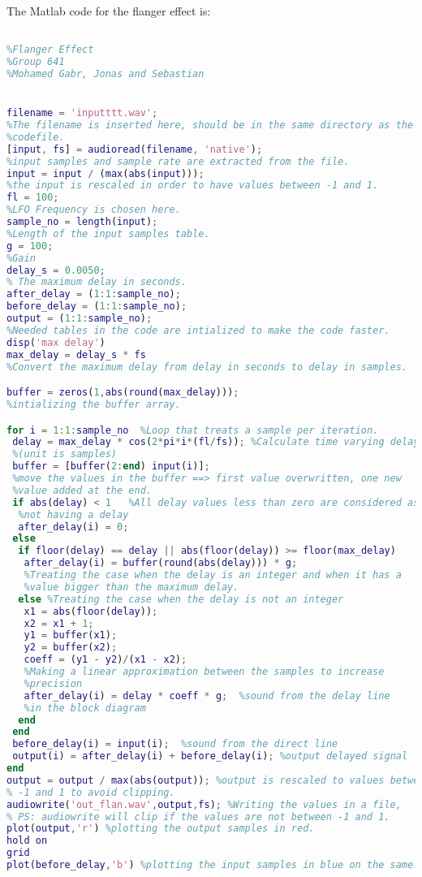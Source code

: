 The Matlab code for the flanger effect is:

\begin{lstlisting}[language=Matlab, caption= Matlab code for flanger effect]

%Flanger Effect
%Group 641
%Mohamed Gabr, Jonas and Sebastian


filename = 'inputttt.wav'; 
%The filename is inserted here, should be in the same directory as the
%codefile.
[input, fs] = audioread(filename, 'native');
%input samples and sample rate are extracted from the file.
input = input / (max(abs(input)));
%the input is rescaled in order to have values between -1 and 1. 
fl = 100;  
%LFO Frequency is chosen here.
sample_no = length(input); 
%Length of the input samples table.
g = 100; 
%Gain
delay_s = 0.0050; 
% The maximum delay in seconds.
after_delay = (1:1:sample_no); 
before_delay = (1:1:sample_no);
output = (1:1:sample_no);
%Needed tables in the code are intialized to make the code faster.
disp('max delay')
max_delay = delay_s * fs  
%Convert the maximum delay from delay in seconds to delay in samples.

buffer = zeros(1,abs(round(max_delay))); 
%intializing the buffer array.

for i = 1:1:sample_no  %Loop that treats a sample per iteration. 
 delay = max_delay * cos(2*pi*i*(fl/fs)); %Calculate time varying delay 
 %(unit is samples)
 buffer = [buffer(2:end) input(i)]; 
 %move the values in the buffer ==> first value overwritten, one new 
 %value added at the end.
 if abs(delay) < 1   %All delay values less than zero are considered as
  %not having a delay
  after_delay(i) = 0;
 else
  if floor(delay) == delay || abs(floor(delay)) >= floor(max_delay)
   after_delay(i) = buffer(round(abs(delay))) * g;
   %Treating the case when the delay is an integer and when it has a
   %value bigger than the maximum delay. 
  else %Treating the case when the delay is not an integer
   x1 = abs(floor(delay));
   x2 = x1 + 1;
   y1 = buffer(x1);
   y2 = buffer(x2);
   coeff = (y1 - y2)/(x1 - x2);
   %Making a linear approximation between the samples to increase
   %precision
   after_delay(i) = delay * coeff * g;  %sound from the delay line
   %in the block diagram 
  end
 end
 before_delay(i) = input(i);  %sound from the direct line
 output(i) = after_delay(i) + before_delay(i); %output delayed signal 
end
output = output / max(abs(output)); %output is rescaled to values between
% -1 and 1 to avoid clipping. 
audiowrite('out_flan.wav',output,fs); %Writing the values in a file, 
% PS: audiowrite will clip if the values are not between -1 and 1. 
plot(output,'r') %plotting the output samples in red.
hold on
grid
plot(before_delay,'b') %plotting the input samples in blue on the same fig.




\end{lstlisting}


